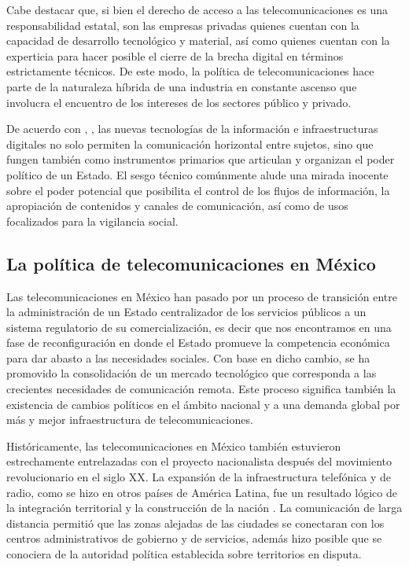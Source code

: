 \documentclass[
  spanish,
  11pt,
  a4paper,
]{scrbook}
\begin{document}
Cabe destacar que, si bien el derecho de acceso a las telecomunicaciones
es una responsabilidad estatal, son las empresas privadas quienes
cuentan con la capacidad de desarrollo tecnológico y material, así como
quienes cuentan con la experticia para hacer posible el cierre de la
brecha digital en términos estrictamente técnicos. De este modo, la
política de telecomunicaciones hace parte de la naturaleza híbrida de
una industria en constante ascenso que involucra el encuentro de los
intereses de los sectores público y privado.

De acuerdo con \textcite{Castells2009}, \textcite{Couldry2019}, las
nuevas tecnologías de la información e infraestructuras digitales no
solo permiten la comunicación horizontal entre sujetos, sino que fungen
también como instrumentos primarios que articulan y organizan el poder
político de un Estado. El sesgo técnico comúnmente alude una mirada
inocente sobre el poder potencial que posibilita el control de los
flujos de información, la apropiación de contenidos y canales de
comunicación, así como de usos focalizados para la vigilancia social.

\subsection*{La política de telecomunicaciones en
México}\label{la-poluxedtica-de-telecomunicaciones-en-muxe9xico}

Las telecomunicaciones en México han pasado por un proceso de transición
entre la administración de un Estado centralizador de los servicios
públicos a un sistema regulatorio de su comercialización, es decir que
nos encontramos en una fase de reconfiguración en donde el Estado
promueve la competencia económica para dar abasto a las necesidades
sociales. Con base en dicho cambio, se ha promovido la consolidación de
un mercado tecnológico que corresponda a las crecientes necesidades de
comunicación remota. Este proceso significa también la existencia de
cambios políticos en el ámbito nacional y a una demanda global por más y
mejor infraestructura de telecomunicaciones.

Históricamente, las telecomunicaciones en México también estuvieron
estrechamente entrelazadas con el proyecto nacionalista después del
movimiento revolucionario en el siglo XX. La expansión de la
infraestructura telefónica y de radio, como se hizo en otros países de
América Latina, fue un resultado lógico de la integración territorial y
la construcción de la nación \autocite{Alvarez2007,Alvarez2018}. La
comunicación de larga distancia permitió que las zonas alejadas de las
ciudades se conectaran con los centros administrativos de gobierno y de
servicios, además hizo posible que se conociera de la autoridad política
establecida sobre territorios en disputa.
\end{document}

